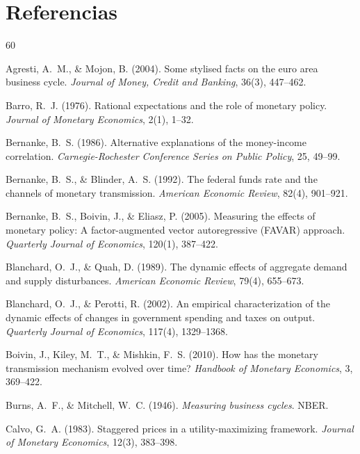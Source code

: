 \documentclass[12pt,a4paper]{article}
\begin{document}
\section*{Referencias}

\begin{thebibliography}{60}

 Agresti, A.~M., \& Mojon, B. (2004). Some stylised facts on the euro area business cycle. \textit{Journal of Money, Credit and Banking}, 36(3), 447--462.

 Barro, R.~J. (1976). Rational expectations and the role of monetary policy. \textit{Journal of Monetary Economics}, 2(1), 1--32.

 Bernanke, B.~S. (1986). Alternative explanations of the money-income correlation. \textit{Carnegie-Rochester Conference Series on Public Policy}, 25, 49--99.

 Bernanke, B.~S., \& Blinder, A.~S. (1992). The federal funds rate and the channels of monetary transmission. \textit{American Economic Review}, 82(4), 901--921.

 Bernanke, B.~S., Boivin, J., \& Eliasz, P. (2005). Measuring the effects of monetary policy: A factor-augmented vector autoregressive (FAVAR) approach. \textit{Quarterly Journal of Economics}, 120(1), 387--422.

 Blanchard, O.~J., \& Quah, D. (1989). The dynamic effects of aggregate demand and supply disturbances. \textit{American Economic Review}, 79(4), 655--673.

 Blanchard, O.~J., \& Perotti, R. (2002). An empirical characterization of the dynamic effects of changes in government spending and taxes on output. \textit{Quarterly Journal of Economics}, 117(4), 1329--1368.

 Boivin, J., Kiley, M.~T., \& Mishkin, F.~S. (2010). How has the monetary transmission mechanism evolved over time? \textit{Handbook of Monetary Economics}, 3, 369--422.

 Burns, A.~F., \& Mitchell, W.~C. (1946). \textit{Measuring business cycles}. NBER.

 Calvo, G.~A. (1983). Staggered prices in a utility-maximizing framework. \textit{Journal of Monetary Economics}, 12(3), 383--398.


\end{thebibliography}
\end{document}
